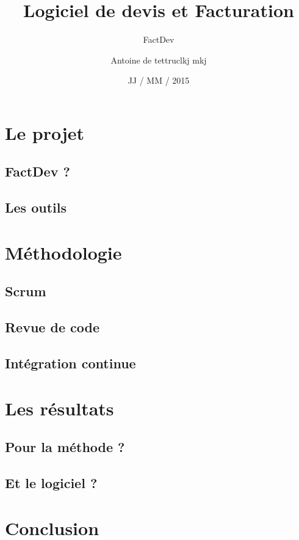 \documentclass{beamer}
\title[] %
{Logiciel de devis et Facturation}
\subtitle {FactDev}
\author[Antoine de \bsc{Roquemaurel}\newline \bsc{Razanajatovo}] %
{Antoine de \bsc{Roquemaurel}\newline tet\newline truc\newline lkj \newline mkj}
\institute[] %
{
Universit\'e Toulouse III -- Paul Sabatier \\
M1 Informatique -- Développement Logiciel 
\vspace{-10px}
}
\date[ ~ ~ ~ JJ / MM / 2015] %
{JJ / MM / 2015}
\begin{document}
\begin{frame}
	\titlepage
\end{frame}
\section{Le projet}
\subsection{FactDev ?}
\subsection{Les outils}
\section{Méthodologie}
\subsection{Scrum}
\subsection{Revue de code}
\subsection{Intégration continue}

\section{Les résultats}
\subsection{Pour la méthode ?}

\subsection{Et le logiciel ?}

\section*{Conclusion}

\begin{frame}
	
\end{frame}
\end{document}
